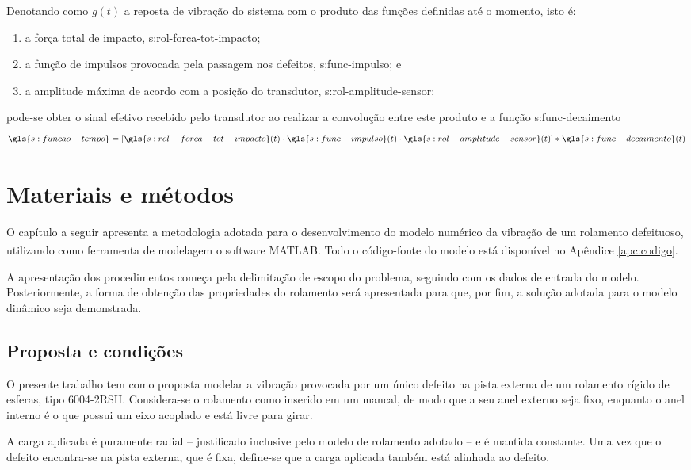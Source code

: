 \documentclass[12pt,oneside,english,brazil,lmodern,siglas,simbolos,cite=num]{ucsmonograph}
\begin{document}
	Denotando como $ g(t) $ a reposta de vibração do sistema com o produto das funções definidas até o momento, isto é:
	\begin{enumerate}
		\item a força total de impacto, \gls{s:rol-forca-tot-impacto};
		\item a função de impulsos provocada pela passagem nos defeitos, \gls{s:func-impulso}; e
		\item a amplitude máxima de acordo com a posição do transdutor, \gls{s:rol-amplitude-sensor};
	\end{enumerate}
	pode-se obter o sinal efetivo recebido pelo transdutor ao realizar a convolução entre este produto e a função \gls{s:func-decaimento} \cite{mcfadden:1984,cong:2013}
	\begin{equation}
		\gls{s:funcao-tempo} = [\gls{s:rol-forca-tot-impacto}(t)\cdot \gls{s:func-impulso}(t)\cdot \gls{s:rol-amplitude-sensor}(t)]\ast\gls{s:func-decaimento}(t)
	\end{equation}
	
	\chapter{Materiais e métodos}
	O capítulo a seguir apresenta a metodologia adotada para o desenvolvimento do modelo numérico da vibração de um rolamento defeituoso, utilizando como ferramenta de modelagem o \foreignlanguage{english}{software} MATLAB\textsuperscript\textregistered.
	Todo o código-fonte do modelo está disponível no Apêndice \ref{apc:codigo}.
	
	A apresentação dos procedimentos começa pela delimitação de escopo do problema, seguindo com os dados de entrada do modelo.
	Posteriormente, a forma de obtenção das propriedades do rolamento será apresentada para que, por fim, a solução adotada para o modelo dinâmico seja demonstrada.
	
	\section{Proposta e condições} \label{sec:proposta-condicoes}
	O presente trabalho tem como proposta modelar a vibração provocada por um único defeito na pista externa de um rolamento rígido de esferas, tipo 6004-2RSH.
	Considera-se o rolamento como inserido em um mancal, de modo que a seu anel externo seja fixo, enquanto o anel interno é o que possui um eixo acoplado e está livre para girar.
	
	A carga aplicada é puramente radial -- justificado inclusive pelo modelo de rolamento adotado -- e é mantida constante.
	Uma vez que o defeito encontra-se na pista externa, que é fixa, define-se que a carga aplicada também está alinhada ao defeito.
	
\end{document}
